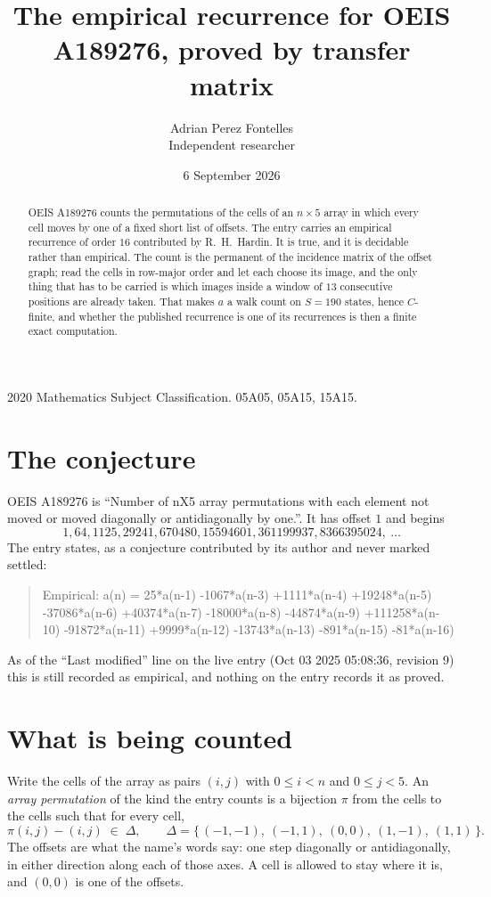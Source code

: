 \documentclass[11pt,a4paper]{article}
\title{The empirical recurrence for OEIS A189276, proved by transfer matrix}
\author{Adrian Perez Fontelles\\ \small Independent researcher}
\date{6 September 2026}
\theoremstyle{plain}
\theoremstyle{definition}
\begin{document}
\maketitle

\begin{abstract}
OEIS A189276 counts the permutations of the cells of an $n\times5$ array in which every cell
moves by one of a fixed short list of offsets. The entry carries an empirical recurrence of
order $16$ contributed by R.~H.~Hardin. It is true, and it is decidable rather than
empirical. The count is the permanent of the incidence matrix of the offset graph; read the
cells in row-major order and let each choose its image, and the only thing that has to be
carried is which images inside a window of $13$ consecutive positions are already taken.
That makes $a$ a walk count on $S=190$ states, hence $C$-finite, and whether the published
recurrence is one of its recurrences is then a finite exact computation.
\end{abstract}

\noindent\small 2020 Mathematics Subject Classification. 05A05, 05A15, 15A15.\normalsize

\section{The conjecture}

OEIS A189276 is ``Number of nX5 array permutations with each element not moved or moved diagonally or antidiagonally by one.''. It has offset $1$ and begins
\[
1, 64, 1125, 29241, 670480, 15594601, 361199937, 8366395024,\ \dots
\]
The entry states, as a conjecture contributed by its author and never marked settled:
\begin{quote}
Empirical: a(n) = 25*a(n-1) -1067*a(n-3) +1111*a(n-4) +19248*a(n-5) -37086*a(n-6) +40374*a(n-7) -18000*a(n-8) -44874*a(n-9) +111258*a(n-10) -91872*a(n-11) +9999*a(n-12) -13743*a(n-13) -891*a(n-15) -81*a(n-16)
\end{quote}
As of the ``Last modified'' line on the live entry (Oct 03 2025 05:08:36, revision 9) this is still
recorded as empirical, and nothing on the entry records it as proved.

\section{What is being counted}

Write the cells of the array as pairs $(i,j)$ with $0\le i<n$ and $0\le j<5$. An
\emph{array permutation} of the kind the entry counts is a bijection $\pi$ from the cells to
the cells such that for every cell,
\[
\pi(i,j)-(i,j)\;\in\;\Delta,\qquad
\Delta=\{\,(-1,-1),\ (-1,1),\ (0,0),\ (1,-1),\ (1,1)\,\}.
\]
The offsets are what the name's words say: one step diagonally or antidiagonally, in either direction along each of those axes. A cell is allowed to stay where it is, and $(0,0)$ is one of the offsets.
\end{document}
